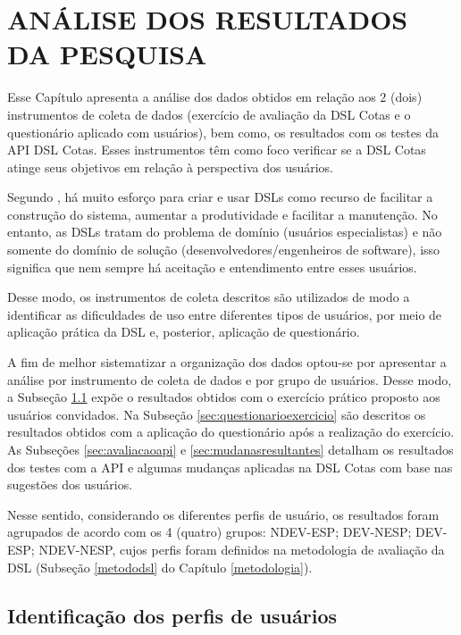 \chapter{ANÁLISE DOS RESULTADOS DA  PESQUISA}
\label{chap:analise}

Esse Capítulo apresenta a análise dos dados obtidos em relação aos 2 (dois) instrumentos de coleta de dados (exercício de avaliação da DSL Cotas e o questionário aplicado com usuários), bem como, os resultados com os testes da API DSL Cotas. Esses instrumentos têm como foco verificar se a DSL Cotas atinge seus objetivos em relação à perspectiva dos usuários. 


Segundo , há muito esforço para criar e usar \gls{DSL}s como recurso de facilitar a construção do sistema, aumentar a produtividade e facilitar a manutenção. No entanto, as \gls{DSL}s tratam do problema de domínio (usuários especialistas) e não somente do domínio de solução (desenvolvedores/engenheiros de software), isso significa que nem sempre há aceitação e entendimento entre esses usuários.

Desse modo, os instrumentos de coleta descritos são utilizados de modo a identificar as dificuldades de uso entre diferentes tipos de usuários, por meio de aplicação prática da DSL e, posterior, aplicação de questionário. 

A fim de melhor sistematizar a organização dos dados optou-se por apresentar a análise por instrumento de coleta de dados e por grupo de usuários. Desse modo, a Subseção \ref{sec:analiseexercicio} expõe o resultados obtidos com o exercício prático proposto aos usuários convidados. Na Subseção \ref{sec:questionarioexercicio} são descritos os resultados obtidos com a aplicação do questionário após a realização do exercício. As Subseções \ref{sec:avaliacaoapi} e \ref{sec:mudanasresultantes} detalham os resultados dos testes com a API e algumas mudanças aplicadas na DSL Cotas com base nas sugestões dos usuários.


Nesse sentido, considerando os diferentes perfis de usuário, os resultados foram agrupados de acordo com os 4 (quatro) grupos:  NDEV-ESP; DEV-NESP; DEV-ESP; NDEV-NESP, cujos perfis foram definidos na metodologia de avaliação da DSL (Subseção \ref{metododsl} do Capítulo \ref{metodologia}).


\section{Identificação dos perfis de usuários}
\label{sec:analiseexercicio}


